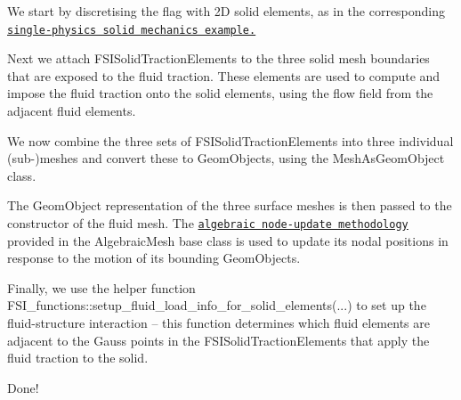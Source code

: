 \begin{DoxyEnumerate}
\item We start by discretising the flag with 2D solid elements, as in the corresponding \href{../../../solid/airy_cantilever/html/index.html}{\tt single-\/physics solid mechanics example.} ~\newline
~\newline

\item Next we attach {\ttfamily F\+S\+I\+Solid\+Traction\+Elements} to the three solid mesh boundaries that are exposed to the fluid traction. These elements are used to compute and impose the fluid traction onto the solid elements, using the flow field from the adjacent fluid elements. ~\newline
~\newline

\item We now combine the three sets of {\ttfamily F\+S\+I\+Solid\+Traction\+Elements} into three individual (sub-\/)meshes and convert these to {\ttfamily Geom\+Objects}, using the {\ttfamily Mesh\+As\+Geom\+Object} class. ~\newline
~\newline

\item The {\ttfamily Geom\+Object} representation of the three surface meshes is then passed to the constructor of the fluid mesh. The \href{../../../interaction/fsi_collapsible_channel_algebraic/html/index.html}{\tt algebraic node-\/update methodology} provided in the {\ttfamily Algebraic\+Mesh} base class is used to update its nodal positions in response to the motion of its bounding {\ttfamily Geom\+Objects}. ~\newline
~\newline

\item Finally, we use the helper function {\ttfamily F\+S\+I\+\_\+functions\+::setup\+\_\+fluid\+\_\+load\+\_\+info\+\_\+for\+\_\+solid\+\_\+elements}(...) to set up the fluid-\/structure interaction -- this function determines which fluid elements are adjacent to the Gauss points in the {\ttfamily F\+S\+I\+Solid\+Traction\+Elements} that apply the fluid traction to the solid. ~\newline
~\newline

\item Done! ~\newline
~\newline

\end{DoxyEnumerate}

